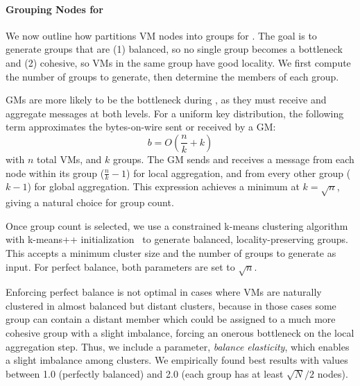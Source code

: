 


\paragraph{Grouping Nodes for \mlha}
We now outline how \marcopolo partitions VM nodes into groups for \mlha. The goal is to generate groups that are (1) balanced, so no single group becomes a bottleneck and (2) cohesive, so VMs in the same group have good locality. We first compute the number of groups to generate, then determine the members of each group.

GMs are more likely to be the bottleneck during \mlha, as they must receive and aggregate messages at both levels. For a uniform key distribution, the following term approximates the bytes-on-wire sent or received by a GM:
\begin{equation}
   b = O\left(\frac{n}{k} + k\right)
\end{equation}
with $n$ total VMs, and $k$ groups. The GM sends and receives a message from each node within its group ($\frac{n}{k} -1$) for local aggregation, and from every other group ($k-1$) for global aggregation. This expression achieves a minimum at $k = \sqrt{n}$, giving a natural choice for group count. %

Once group count is selected, we use a constrained k-means clustering algorithm with k-means++ initialization~\cite{bradley2000constrained, arthur2007k} to generate balanced, locality-preserving groups. This accepts a minimum cluster size and the number of groups to generate as input. %
For perfect balance, both parameters are set to $\sqrt{n}$. %

Enforcing perfect balance is not optimal in cases where VMs are naturally clustered in almost balanced but distant clusters, because in those cases some group can contain a distant member which could be assigned to a much more cohesive group with a slight imbalance, forcing an onerous bottleneck on the local aggregation step. Thus, we include a parameter, \textit{balance elasticity}, which enables a slight imbalance among clusters. We empirically found best results with values between 1.0 (perfectly balanced) and 2.0 (each group has at least $\sqrt{N}/2$ nodes). %

